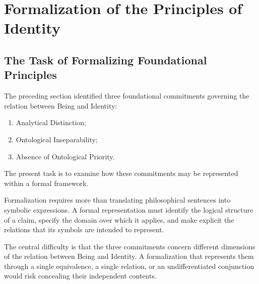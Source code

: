 %
%
%
%
%

\section{Formalization of the Principles of Identity}
\label{sec:ch07_s06}

\subsection{The Task of Formalizing Foundational Principles}

The preceding section identified three foundational commitments
governing the relation between Being and Identity:

\begin{enumerate}
    \item Analytical Distinction;
    \item Ontological Inseparability;
    \item Absence of Ontological Priority.
\end{enumerate}

The present task is to examine how these commitments may be
represented within a formal framework.

Formalization requires more than translating philosophical
sentences into symbolic expressions. A formal representation
must identify the logical structure of a claim, specify the
domain over which it applies, and make explicit the relations
that its symbols are intended to represent.

The central difficulty is that the three commitments concern
different dimensions of the relation between Being and Identity.
A formalization that represents them through a single equivalence,
a single relation, or an undifferentiated conjunction would risk
concealing their independent contents.

